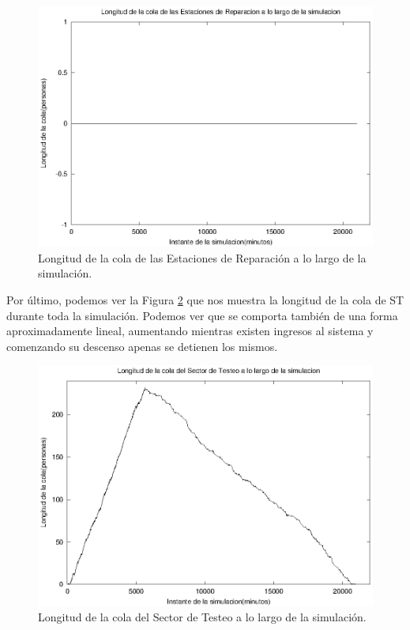 \documentclass[a4paper,10pt]{article}
\begin{document}
\begin{figure}[ht]
\begin{center}
\includegraphics[width=15cm]{./img/cola_ER.eps}
\caption{\label{fig:cola_ER} Longitud de la cola de las Estaciones de Reparaci\'on a lo largo de la simulaci\'on.}
\end{center}
\end{figure}
Por último, podemos ver la Figura \ref{fig:cola_ST} que nos muestra la longitud de la cola de ST durante toda la simulación. Podemos ver que se comporta también de una forma aproximadamente lineal, aumentando mientras existen ingresos al sistema y comenzando su descenso apenas se detienen los mismos.
\begin{figure}[ht]
\begin{center}
\includegraphics[width=15cm]{./img/cola_ST.eps}
\caption{\label{fig:cola_ST} Longitud de la cola del Sector de Testeo a lo largo de la simulaci\'on.}
\end{center}
\end{figure}
\end{document}
